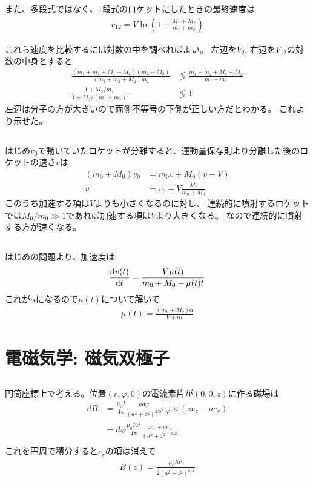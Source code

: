 \documentclass[../../master.tex]{subfiles}
\begin{document}
また、多段式ではなく、1段式のロケットにしたときの最終速度は
\begin{align}
    v_{12} = V\ln(1+\frac{M_1+M_2}{m_1+m_2})
\end{align}

これら速度を比較するには対数の中を調べればよい。
左辺を\(V_2\), 右辺を\(V_{12}\)の対数の中身とすると
\begin{align}
    \frac{(m_1+m_2+M_1+M_2)(m_2+M_2)}{(m_1+m_2+M_2)m_2}&\lessgtr\frac{m_1+m_2+M_1+M_2}{m_1+m_2}\\
    \frac{1+M_2/m_1}{1+M_2/(m_1+m_2)}& \lessgtr 1
\end{align}
左辺は分子の方が大きいので両側不等号の下側が正しい方だとわかる。
これより示せた。

\section{}
はじめ\(v_0\)で動いていたロケットが分離すると、運動量保存則より分離した後のロケットの速さ\(v\)は
\begin{align}
    (m_0+M_0)v_0 &= m_0 v + M_0(v-V)\\
    v &= v_0 +V\frac{M_0}{m_0 + M_0}
\end{align}
このうち加速する項は\(V\)よりも小さくなるのに対し、
連続的に噴射するロケットでは\(M_0/m_0 \gg 1\)であれば加速する項は\(V\)より大きくなる。
なので連続的に噴射する方が速くなる。

\section{}
はじめの問題より、加速度は
\begin{align}
    \dv{v(t)}{t} = \frac{V\mu(t)}{m_0+M_0-\mu(t)t}
\end{align}
これが\(\alpha\)になるので\(\mu(t)\)について解いて
\begin{align}
    \mu(t) = \frac{(m_0+M_0)\alpha}{V+\alpha t}
\end{align}

\chapter{電磁気学: 磁気双極子}
\section{}
円筒座標上で考える。位置\((r,\varphi,0)\)の電流素片が\((0,0,z)\)に作る磁場は
\begin{align}
    dB &= \frac{\mu_0I}{4\pi}\frac{ad\varphi}{(a^2+z^2)^{3/2}} e_{\varphi}\times(ze_z-ae_r)\\
       &= d\varphi\frac{\mu_0Ia^2}{4\pi}\frac{ze_r+ae_z}{(a^2+z^2)^{3/2}} \\
\end{align}
これを円周で積分すると\(e_r\)の項は消えて
\begin{align}
    B(z) = \frac{\mu_0Ia^2}{2(a^2+z^2)^{3/2}}
\end{align}
\end{document}
